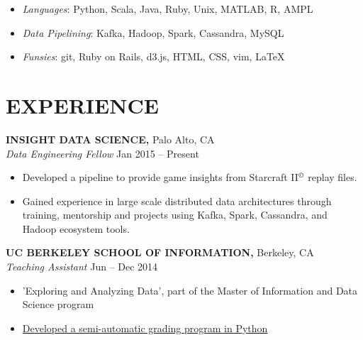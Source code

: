 \documentclass[geomargin]{res}
\begin{document}
\begin{resume}
\begin{itemize}
  \item \textit{Languages}: Python, Scala, Java, Ruby, Unix, MATLAB, R, AMPL
  \item \textit{Data Pipelining}: Kafka, Hadoop, Spark, Cassandra, MySQL
  \item \textit{Funsies}: git, Ruby on Rails, d3.js, HTML, CSS, vim, \LaTeX
\end{itemize}


\section{EXPERIENCE}

{\bf INSIGHT DATA SCIENCE,} Palo Alto, CA \\
{\em Data Engineering Fellow} \hfill
Jan 2015 -- Present \\                                          \vspace{-4mm}
\begin{itemize}                                         \itemsep1pt %
  \item Developed a pipeline to provide game insights from Starcraft II\(^\copyright\)
     replay files.
  \item Gained experience in large scale distributed data architectures through training,
    mentorship and projects using Kafka, Spark, Cassandra, and Hadoop ecosystem tools.
\end{itemize}
\vspace{-1mm}

{\bf UC BERKELEY SCHOOL OF INFORMATION,} Berkeley, CA \\
{\em Teaching Assistant} \hfill
Jun -- Dec 2014 \\                                          \vspace{-4mm}
\begin{itemize}                                         \itemsep1pt %
  \item 'Exploring and Analyzing Data', part of the Master of Information and Data
    Science program
  \item  \href{https://github.com/gy8/project_auto-grading}
    {Developed a semi-automatic grading program in Python}
\end{itemize}
\vspace{-1mm}


\end{resume}
\end{document}
